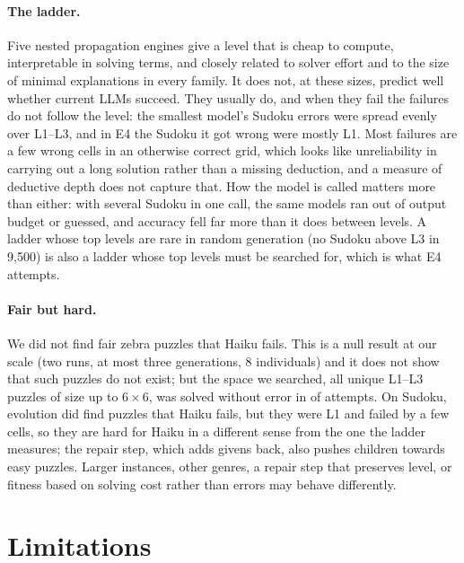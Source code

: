 \paragraph{The ladder.} Five nested propagation engines give a level that is cheap to compute, interpretable in solving terms, and closely related to solver effort and to the size of minimal explanations in every family. It does not, at these sizes, predict well whether current LLMs succeed. They usually do, and when they fail the failures do not follow the level: the smallest model's Sudoku errors were spread evenly over L1--L3, and in E4 the Sudoku it got wrong were mostly L1. Most failures are a few wrong cells in an otherwise correct grid, which looks like unreliability in carrying out a long solution rather than a missing deduction, and a measure of deductive depth does not capture that. How the model is called matters more than either: with several Sudoku in one call, the same models ran out of output budget or guessed, and accuracy fell far more than it does between levels. A ladder whose top levels are rare in random generation (no Sudoku above L3 in 9{,}500) is also a ladder whose top levels must be searched for, which is what E4 attempts.

\paragraph{Fair but hard.} We did not find fair zebra puzzles that Haiku fails. This is a null result at our scale (two runs, at most three generations, 8 individuals) and it does not show that such puzzles do not exist; but the space we searched, all unique L1--L3 puzzles of size up to $6{\times}6$, was solved without error in \EFourZebraEvals of \EFourZebraEvals attempts. On Sudoku, evolution did find puzzles that Haiku fails, but they were L1 and failed by a few cells, so they are hard for Haiku in a different sense from the one the ladder measures; the repair step, which adds givens back, also pushes children towards easy puzzles. Larger instances, other genres, a repair step that preserves level, or fitness based on solving cost rather than errors may behave differently.

\section{Limitations}
\label{sec:limitations}

